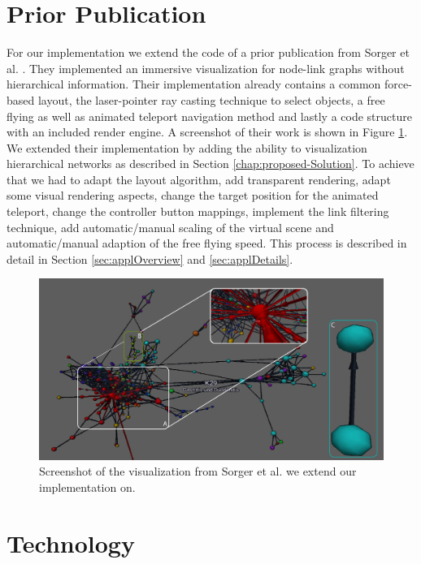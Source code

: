 \section{Prior Publication}
For our implementation we extend the code of a prior publication from Sorger et al. \cite{sorger_immersive_2019}. 
They implemented an immersive visualization for node-link graphs without hierarchical information. Their implementation already contains a common force-based layout, the laser-pointer ray casting technique to select objects, a free flying as well as animated teleport navigation method and lastly a code structure with an included render engine. A screenshot of their work is shown in Figure \ref{fig:priorPublication}.\\
We extended their implementation by adding the ability to visualization hierarchical networks as described in Section \ref{chap:proposed-Solution}. To achieve that we had to adapt the layout algorithm, add transparent rendering, adapt some visual rendering aspects, change the target position for the animated teleport, change the controller button mappings, implement the link filtering technique, add automatic/manual scaling of the virtual scene and automatic/manual adaption of the free flying speed.
This process is described in detail in Section \ref{sec:applOverview} and \ref{sec:applDetails}.

\begin{figure}[!hbt]
    \centering
    \includegraphics[width=\textwidth]{graphics/screenshotPriorPublication.jpg}
    \caption{Screenshot of the visualization from Sorger et al. \cite{sorger_immersive_2019} we extend our implementation on.}
    \label{fig:priorPublication}
\end{figure}

\section{Technology}

